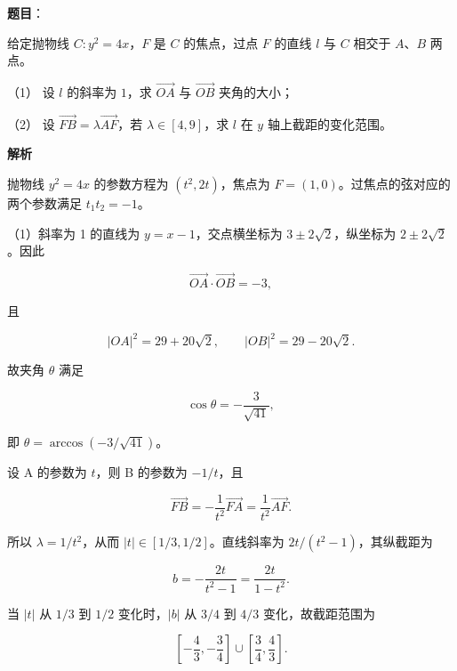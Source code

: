 \begin{answer}

\textbf{题目}：

给定抛物线 $C:y^2=4x$，$F$ 是 $C$ 的焦点，过点 $F$ 的直线 $l$ 与 $C$ 相交于 $A\text{、}B$ 两点。

（1） 设 $l$ 的斜率为 $1$，求 $\overrightarrow{OA}$ 与 $\overrightarrow{OB}$ 夹角的大小；

（2） 设 $\overrightarrow{FB}=\lambda\overrightarrow{AF}$，若 $\lambda\in[4,9]$，求 $l$ 在 $y$ 轴上截距的变化范围。

\textbf{解析}


抛物线 $y^2=4x$ 的参数方程为 $(t^2,2t)$，焦点为 $F=(1,0)$。过焦点的弦对应的两个参数满足 $t_1t_2=-1$。

（1）斜率为 1 的直线为 $y=x-1$，交点横坐标为 $3\pm2\sqrt2$，纵坐标为 $2\pm2\sqrt2$。因此

\nopagebreak[4]
\[
\overrightarrow{OA}\cdot\overrightarrow{OB}=-3,
\]

且

\nopagebreak[4]
\[
|OA|^2=29+20\sqrt2,\qquad |OB|^2=29-20\sqrt2.
\]

故夹角 $\theta$ 满足

\nopagebreak[4]
\[
\cos\theta=-\frac3{\sqrt{41}},
\]

即 $\theta=\arccos(-3/\sqrt{41})$。


设 A 的参数为 $t$，则 B 的参数为 $-1/t$，且

\nopagebreak[4]
\[
\overrightarrow{FB}=-\frac1{t^2}\overrightarrow{FA}
=\frac1{t^2}\overrightarrow{AF}.
\]

所以 $\lambda=1/t^2$，从而 $|t|\in[1/3,1/2]$。直线斜率为 $2t/(t^2-1)$，其纵截距为

\nopagebreak[4]
\[
b=-\frac{2t}{t^2-1}=\frac{2t}{1-t^2}.
\]

当 $|t|$ 从 $1/3$ 到 $1/2$ 变化时，$|b|$ 从 $3/4$ 到 $4/3$ 变化，故截距范围为

\nopagebreak[4]
\[
\left[-\frac43,-\frac34\right]\cup
\left[\frac34,\frac43\right].
\]



\end{answer}
